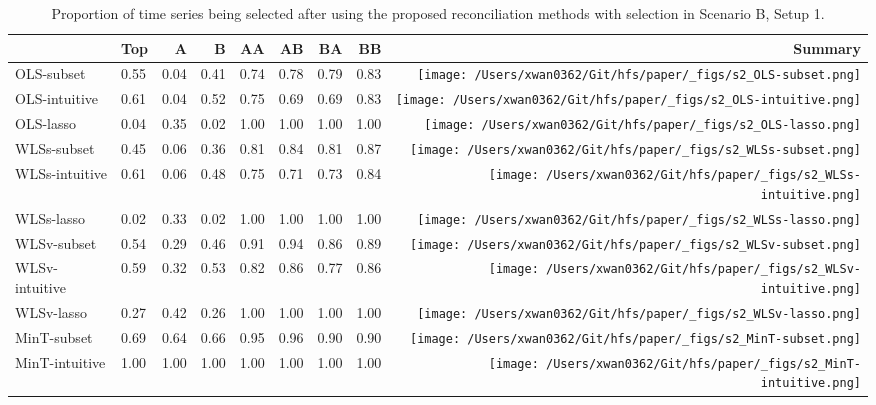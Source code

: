 \documentclass[
  11pt]{article}
\begin{document}
\hypertarget{tbl-s2-selection}{}
\begin{table}
\caption{\label{tbl-s2-selection}Proportion of time series being selected after using the proposed
reconciliation methods with selection in Scenario B, Setup 1. }\tabularnewline

\centering\begingroup\fontsize{11}{13}\selectfont

\begin{threeparttable}
\begin{tabular}{llrrrrrr>{}r}
\toprule
  & Top & A & B & AA & AB & BA & BB & Summary\\
\midrule
OLS-subset & 0.55 & 0.04 & 0.41 & 0.74 & 0.78 & 0.79 & 0.83 & \texttt{[image: /Users/xwan0362/Git/hfs/paper/\_figs/s2\_OLS-subset.png]}\\
OLS-intuitive & 0.61 & 0.04 & 0.52 & 0.75 & 0.69 & 0.69 & 0.83 & \texttt{[image: /Users/xwan0362/Git/hfs/paper/\_figs/s2\_OLS-intuitive.png]}\\
OLS-lasso & 0.04 & 0.35 & 0.02 & 1.00 & 1.00 & 1.00 & 1.00 & \texttt{[image: /Users/xwan0362/Git/hfs/paper/\_figs/s2\_OLS-lasso.png]}\\
\midrule
WLSs-subset & 0.45 & 0.06 & 0.36 & 0.81 & 0.84 & 0.81 & 0.87 & \texttt{[image: /Users/xwan0362/Git/hfs/paper/\_figs/s2\_WLSs-subset.png]}\\
WLSs-intuitive & 0.61 & 0.06 & 0.48 & 0.75 & 0.71 & 0.73 & 0.84 & \texttt{[image: /Users/xwan0362/Git/hfs/paper/\_figs/s2\_WLSs-intuitive.png]}\\
WLSs-lasso & 0.02 & 0.33 & 0.02 & 1.00 & 1.00 & 1.00 & 1.00 & \texttt{[image: /Users/xwan0362/Git/hfs/paper/\_figs/s2\_WLSs-lasso.png]}\\
\midrule
WLSv-subset & 0.54 & 0.29 & 0.46 & 0.91 & 0.94 & 0.86 & 0.89 & \texttt{[image: /Users/xwan0362/Git/hfs/paper/\_figs/s2\_WLSv-subset.png]}\\
WLSv-intuitive & 0.59 & 0.32 & 0.53 & 0.82 & 0.86 & 0.77 & 0.86 & \texttt{[image: /Users/xwan0362/Git/hfs/paper/\_figs/s2\_WLSv-intuitive.png]}\\
WLSv-lasso & 0.27 & 0.42 & 0.26 & 1.00 & 1.00 & 1.00 & 1.00 & \texttt{[image: /Users/xwan0362/Git/hfs/paper/\_figs/s2\_WLSv-lasso.png]}\\
\midrule
MinT-subset & 0.69 & 0.64 & 0.66 & 0.95 & 0.96 & 0.90 & 0.90 & \texttt{[image: /Users/xwan0362/Git/hfs/paper/\_figs/s2\_MinT-subset.png]}\\
MinT-intuitive & 1.00 & 1.00 & 1.00 & 1.00 & 1.00 & 1.00 & 1.00 & \texttt{[image: /Users/xwan0362/Git/hfs/paper/\_figs/s2\_MinT-intuitive.png]}\\

\end{tabular}
\end{threeparttable}
\end{table}
\end{document}
